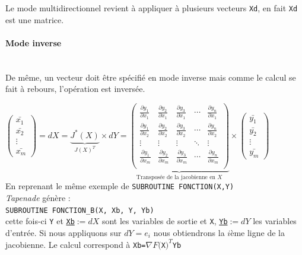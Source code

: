 Le mode multidirectionnel revient \`a appliquer \`a plusieurs vecteurs {\tt Xd}, en fait {\tt Xd} est une matrice. %


\paragraph{Mode inverse} \hfill \\
De même, un vecteur doit être sp\'ecifi\'e en mode inverse mais comme le calcul se fait \`a rebours, l'op\'eration 
est invers\'ee.




$\left( 
\begin{array}{c} 
\bar{x_1} \\
\bar{x_2} \\
\vdots \\
\bar{x_m}

\end{array}
\right)
=dX = \underbrace{J^*(X)}_{J(X)^T} \times dY = 
\underbrace{
\left(
\begin{array}{ccccc} 
\frac{\partial y_1}{\partial x_1} & \frac{\partial y_2}{\partial x_1} &
 \frac{\partial y_3}{\partial x_1} & \cdots & \frac{\partial y_n}{\partial x_1} \\
\frac{\partial y_1}{\partial x_2} & \frac{\partial y_2}{\partial x_2} &
 \frac{\partial y_3}{\partial x_2} & \cdots & \frac{\partial y_n}{\partial x_2} \\
\vdots & \vdots & \vdots & \ddots & \vdots \\
\frac{\partial y_1}{\partial x_m} & \frac{\partial y_2}{\partial x_m} &
 \frac{\partial y_3}{\partial x_m} & \cdots & \frac{\partial y_n}{\partial x_m} \\
\end{array}
\right)}_{\text{Transpos\'ee de la jacobienne en }X}
 \times
\left( 
\begin{array}{c} 
\bar{y_1} \\
\bar{y_2} \\
\vdots \\
\bar{y_m}

\end{array}
\right)
 $ \\ 
En reprenant le même exemple de 
\verb!SUBROUTINE FONCTION(X,Y)!\\
{\it Tapenade} g\'en\`ere :\\
\verb!SUBROUTINE FONCTION_B(X, Xb, Y, Yb)!\\
cette fois-ci {\tt Y} et {\tt \underline{Xb}}$:=dX$ sont les variables de sortie et {\tt X}, {\tt\underline{Yb}}$:=dY$ les variables d'entr\'ee. 
Si nous appliquons sur $dY=e_i$ nous obtiendrons la $i$\`eme ligne de la jacobienne.
Le calcul correspond \`a {\tt Xb=}$\nabla F(${\tt X}$)^T${\tt Yb}





